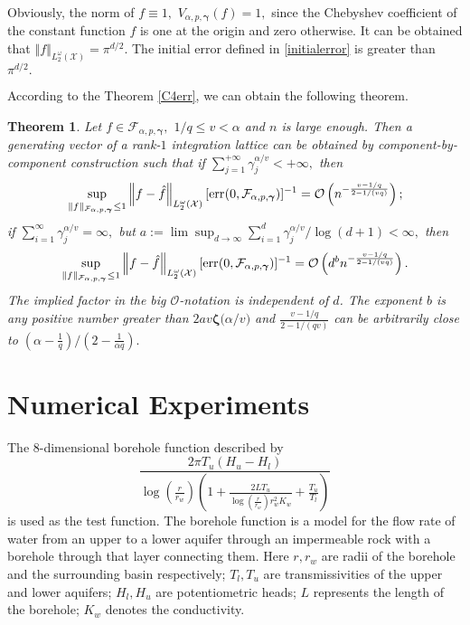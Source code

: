 \documentclass[article]{siamltex}
\newtheorem{Theorem}{Theorem}
\def\bgam{{\boldsymbol \gamma }}
\def\bzeta{{\boldsymbol \zeta }}
\def\calF {\mathcal {F}}
\newcommand{\norm}[1]{\left\Vert#1\right\Vert}
\newcommand{\dsum}{\displaystyle\sum}
\DeclareMathOperator*{\err}{err} \DeclareMathOperator*{\avg}{avg}
\begin{document}
Obviously, the norm of  $f\equiv 1,$ $V_{\alpha,p,{\bgam}}(f)=1,$
since the Chebyshev coefficient of the constant function $f$ is
one at the origin and  zero otherwise. It can be obtained that
$\norm{f}_{L_2^{\omega}(\mathcal X)}=\pi^{d/2}.$ The initial error
defined in \eqref{initialerror} is greater than $\pi^{d/2}.$

According to the Theorem \ref{C4err},  we  can obtain the following
theorem. \vskip5mm
\begin{Theorem}\label{trc4errrst}
Let $f \in {\calF}_{\alpha,p,{\bgam}},$
 $1/q\leq v<\alpha$ and $n$ is large enough. Then a
generating vector of a rank-$1$ integration lattice can be
obtained  by component-by-component construction such that
 if $\dsum_{j=1}^{+\infty}
\gamma_j^{\alpha/v}<+\infty,$  then
\begin{eqnarray}
\sup_{\|f\|_{\mathcal F_{\alpha,p,{\bgam}}}\leq 1}
\norm{f-\hat{f}}_{L_2^{\omega}(\mathcal
X)}[\err\hspace{0.01cm}(0,\mathcal F_{\alpha,p,{\bgam}})]^{-1}
=\mathcal{O}\left(n^{-\frac{v-1/q}{ 2-1/(vq)}}\right);
\end{eqnarray}if
$\sum\limits_{i=1}^{\infty}\gamma_j^{\alpha/v}=\infty,$
but
$a:=\lim\sup_{d\rightarrow\infty}\sum\limits_{i=1}^{d}\gamma_j^{\alpha/v}/\log(d+1)<\infty,$
then
\begin{eqnarray}\sup_{\|f\|_{\mathcal F_{\alpha,p,{\bgam}}}\leq 1}
\norm{f-\hat{f}}_{L_2^{\omega}(\mathcal
X)}[\err\hspace{0.01cm}(0,\mathcal F_{\alpha,p,{\bgam}})]^{-1}
=\mathcal{O}\left(d^{b}n^{-\frac{v-1/q}{ 2-1/(vq)}}\right) .
\end{eqnarray}
The implied factor in the big $\mathcal{O}$-notation is
independent of $d$. The exponent $b$ is any positive number
greater than $2av\bzeta\big(\alpha / v \big)$ and
$\frac{v-1/q}{2-1/(qv)}$ can be arbitrarily close to
$({\alpha-\frac{1}{q}})/({2-\frac{1}{\alpha q}}).$
\end{Theorem}


\vskip8mm  \section{Numerical Experiments}

The $8$-dimensional borehole function described by
\cite{MorMitYlv93}
\begin{equation}\label{borehole}
\displaystyle\frac{2\pi
T_u(H_u-H_l)}{\log(\frac{r}{r_w})\left(1+\frac{2L
T_u}{\log(\frac{r}{r_w})r_w^2K_w}+\frac{T_u}{T_l}\right)}
\end{equation}
is used  as the test function. The borehole function is a model
for the flow rate of water from an upper to a lower aquifer
through an impermeable rock with a borehole through that layer
connecting them. Here $r,r_w$ are radii of the borehole and the
surrounding basin respectively;
 $T_l,T_u$ are  transmissivities of the upper and lower aquifers;
 $H_l,H_u$ are potentiometric heads;
 $L$ represents the length of the borehole;
 $K_w$ denotes the conductivity.
\end{document}
